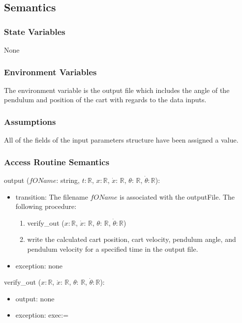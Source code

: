 \documentclass[12pt, titlepage]{article}
\begin{document}
\subsection{Semantics}

\subsubsection{State Variables}
None
\subsubsection{Environment Variables}
The environment variable is the output file which includes the angle of the pendulum and position of the cart with regards to the data inputs.

\subsubsection{Assumptions}
All of the fields of the input parameters structure have been assigned a value.
\subsubsection{Access Routine Semantics}


\noindent output ($fOName$: string, $t$$: \mathbb{R}$, $x$$: \mathbb{R}$, $\dot{x}$: $\mathbb{R}$, $\theta$: $\mathbb{R}$, $\dot{\theta}$$: 
 \mathbb{R}$):
\begin{itemize}

\item transition: The filename $fOName$ is associated with the outputFile. The following procedure:
\begin{enumerate}
\item verify\_out ($x$$: \mathbb{R}$, $\dot{x}$: $\mathbb{R}$, $\theta$: $\mathbb{R}$, $\dot{\theta}$$: 
 \mathbb{R}$)
\item write the calculated cart position, cart velocity, pendulum angle, and pendulum velocity for a specified time in the output file.
\end{enumerate}

\item exception: none 

\end{itemize}

\noindent verify\_out ($x$$: \mathbb{R}$, $\dot{x}$: $\mathbb{R}$, $\theta$: $\mathbb{R}$, $\dot{\theta}$$: \mathbb{R}$):
\begin{itemize}
\item output: none
\item exception: exec:= 
\end{itemize}
\end{document}
